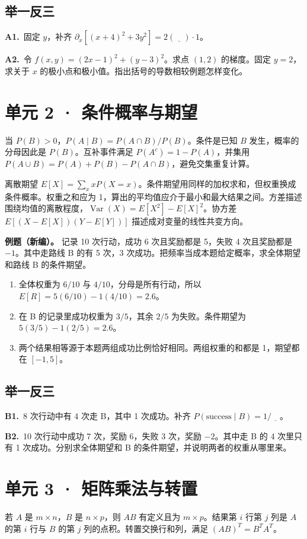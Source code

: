 \documentclass[UTF8,a4paper,11pt]{ctexart}
\newcommand{\PracticeQuestion}[3]{\par\Needspace{4\baselineskip}\noindent\begin{minipage}{\linewidth}\textbf{#1.}\ #2\par\noindent\rule{0pt}{#3mm}\par\end{minipage}\par}
\begin{document}
\subsection{举一反三}
\PracticeQuestion{A1}{固定 $y$，补齐 $\partial_x[(x+4)^2+3y^2]=2(\underline{\quad})\cdot1$。}{23}
\PracticeQuestion{A2}{令 $f(x,y)=(2x-1)^2+(y-3)^2$。求点 $(1,2)$ 的梯度。固定 $y=2$，求关于 $x$ 的极小点和极小值。指出括号的导数相较例题怎样变化。}{26}
\clearpage
\section{单元 2 · 条件概率与期望}
当 $P(B)>0$，$P(A\mid B)=P(A\cap B)/P(B)$。条件是已知 $B$ 发生，概率的分母因此是 $P(B)$。互补事件满足 $P(A^c)=1-P(A)$，并集用 $P(A\cup B)=P(A)+P(B)-P(A\cap B)$，避免交集重复计算。

离散期望 $E[X]=\sum_x xP(X=x)$。条件期望用同样的加权求和，但权重换成条件概率。权重之和应为 1，算出的平均值应介于最小和最大结果之间。方差描述围绕均值的离散程度，$\operatorname{Var}(X)=E[X^2]-E[X]^2$。协方差 $E[(X-E[X])(Y-E[Y])]$ 描述成对变量的线性共变方向。

\textbf{例题（新编）。} 记录 10 次行动，成功 6 次且奖励都是 5，失败 4 次且奖励都是 $-1$。其中走路线 B 的有 5 次，3 次成功。把频率当成本题给定概率，求全体期望和路线 B 的条件期望。

\begin{enumerate}
\item 全体权重为 $6/10$ 与 $4/10$，分母是所有行动，所以 $E[R]=5(6/10)-1(4/10)=2.6$。
\item 在 B 的记录里成功权重为 $3/5$，其余 $2/5$ 为失败。条件期望为 $5(3/5)-1(2/5)=2.6$。
\item 两个结果相等源于本题两组成功比例恰好相同。两组权重的和都是 1，期望都在 $[-1,5]$。
\end{enumerate}
\subsection{举一反三}
\PracticeQuestion{B1}{8 次行动中有 4 次走 B，其中 1 次成功。补齐 $P(\mathrm{success}\mid B)=1/\underline{\quad}$。}{24}
\PracticeQuestion{B2}{10 次行动中成功 7 次，奖励 6，失败 3 次，奖励 $-2$。其中走 B 的 4 次里只有 1 次成功。分别求全体期望和 B 的条件期望，并说明两者的权重从哪里来。}{34}
\clearpage
\section{单元 3 · 矩阵乘法与转置}
若 $A$ 是 $m\times n$，$B$ 是 $n\times p$，则 $AB$ 有定义且为 $m\times p$。结果第 $i$ 行第 $j$ 列是 $A$ 的第 $i$ 行与 $B$ 的第 $j$ 列的点积。转置交换行和列，满足 $(AB)^T=B^TA^T$。
\end{document}
